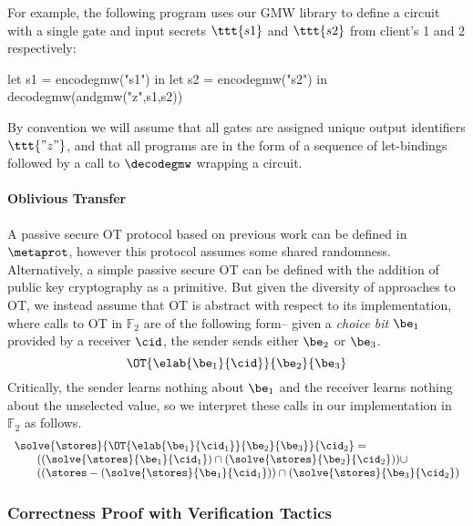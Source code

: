 For example, the following program uses our GMW library to define
a circuit with a single \eand gate and input secrets $\ttt{s1}$ and
$\ttt{s2}$ from client's 1 and 2 respectively:
\begin{verbatimtab}
         let s1 = encodegmw("s1") in
         let s2 = encodegmw("s2") in
         decodegmw(andgmw("z",s1,s2))
\end{verbatimtab}
By convention we will assume that all gates are assigned unique output
identifiers $\ttt{"z"}$, and that all programs are in the form
of a sequence of let-bindings followed by a call to $\decodegmw$
wrapping a circuit.

\paragraph{Oblivious Transfer} A passive secure OT protocol
based on previous work \cite{XXX} can be defined in $\metaprot$,
however this protocol assumes some shared randomness. Alternatively,
a simple passive secure OT can be defined with the addition of
public key cryptography as a primitive. But given the diversity
of approaches to OT, we instead assume that OT is abstract with
respect to its implementation, where calls to OT in $\mathbb{F}_2$
are of the following form-- given a \emph{choice bit}
$\be_1$ provided by a receiver $\cid$, the sender
sends either $\be_2$ or $\be_3$.
$$
\OT{\elab{\be_1}{\cid}}{\be_2}{\be_3}
$$
Critically, the sender learns nothing about $\be_1$ and the
receiver learns nothing about the unselected value, so we interpret
these calls in our implementation in $\mathbb{F}_2$ as follows.
$$
\begin{array}{l}
\solve{\stores}{\OT{\elab{\be_1}{\cid_1}}{\be_2}{\be_3}}{\cid_2} = \\
\qquad ((\solve{\stores}{\be_1}{\cid_1}) \cap 
(\solve{\stores}{\be_2}{\cid_2})) \cup \\
\qquad ((\stores - (\solve{\stores}{\be_1}{\cid_1})) \cap
(\solve{\stores}{\be_3}{\cid_2})
\end{array}
$$

\subsubsection{Correctness Proof with Verification Tactics}

